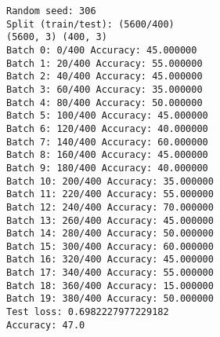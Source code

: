 \documentclass[11pt]{article}
\begin{document}
    \begin{Verbatim}[commandchars=\\\{\}]
Random seed: 306
Split (train/test): (5600/400)
(5600, 3) (400, 3)
Batch 0: 0/400 Accuracy: 45.000000
Batch 1: 20/400 Accuracy: 55.000000
Batch 2: 40/400 Accuracy: 45.000000
Batch 3: 60/400 Accuracy: 35.000000
Batch 4: 80/400 Accuracy: 50.000000
Batch 5: 100/400 Accuracy: 45.000000
Batch 6: 120/400 Accuracy: 40.000000
Batch 7: 140/400 Accuracy: 60.000000
Batch 8: 160/400 Accuracy: 45.000000
Batch 9: 180/400 Accuracy: 40.000000
Batch 10: 200/400 Accuracy: 35.000000
Batch 11: 220/400 Accuracy: 55.000000
Batch 12: 240/400 Accuracy: 70.000000
Batch 13: 260/400 Accuracy: 45.000000
Batch 14: 280/400 Accuracy: 50.000000
Batch 15: 300/400 Accuracy: 60.000000
Batch 16: 320/400 Accuracy: 45.000000
Batch 17: 340/400 Accuracy: 55.000000
Batch 18: 360/400 Accuracy: 15.000000
Batch 19: 380/400 Accuracy: 50.000000
Test loss: 0.6982227977229182
Accuracy: 47.0

    \end{Verbatim}
\end{document}

